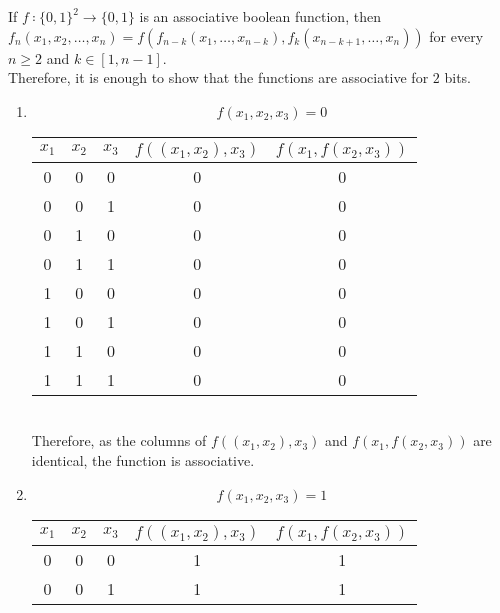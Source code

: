 \documentclass[fleqn, a4paper, 11pt, oneside]{amsart}
\theoremstyle{definition}
\theoremstyle{theorem}
\theoremstyle{remark}
\begin{document}
\begin{solution}
	If $f ∶ \{0,1\}^2 \to \{0,1\}$ is an associative boolean function, then $f_n(x_1,x_2,\dots,x_n) = f\left( f_{n−k}(x_1,\dots,x_{n−k}),f_k(x_{n − k + 1},\dots,x_n) \right)$ for every $n \ge 2$ and $k \in [1,n − 1]$.\\
	Therefore, it is enough to show that the functions are associative for $2$ bits.\\
	\begin{enumerate}
		\item
			\begin{equation*}
				f(x_1,x_2,x_3) = 0
			\end{equation*}
			\begin{tabular}{|c|c|c||c|c|}
				\hline
				$x_1$ & $x_2$ & $x_3$ & $f((x_1,x_2),x_3)$ & $f(x_1,f(x_2,x_3))$ \\
				\hline
				0     & 0     & 0     & 0                  & 0                   \\
				0     & 0     & 1     & 0                  & 0                   \\
				0     & 1     & 0     & 0                  & 0                   \\
				0     & 1     & 1     & 0                  & 0                   \\
				1     & 0     & 0     & 0                  & 0                   \\
				1     & 0     & 1     & 0                  & 0                   \\
				1     & 1     & 0     & 0                  & 0                   \\
				1     & 1     & 1     & 0                  & 0                   \\
				\hline
	       		\end{tabular}\\
			Therefore, as the columns of $f((x_1,x_2),x_3)$ and $f(x_1,f(x_2,x_3))$ are identical, the function is associative.\\
		\item
			\begin{equation*}
				f(x_1,x_2,x_3) = 1
			\end{equation*}
			\begin{tabular}{|c|c|c||c|c|}
				\hline
				$x_1$ & $x_2$ & $x_3$ & $f((x_1,x_2),x_3)$ & $f(x_1,f(x_2,x_3))$ \\
				\hline
				0     & 0     & 0     & 1                  & 1                   \\
				0     & 0     & 1     & 1                  & 1                   \\

\end{tabular}
\end{enumerate}
\end{solution}
\end{document}
